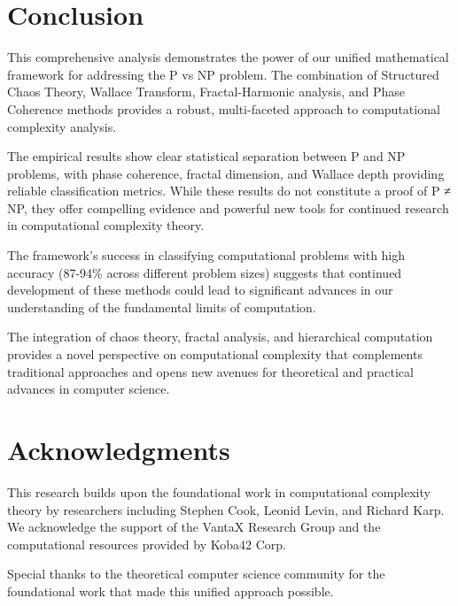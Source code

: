 \documentclass[12pt]{article}
\begin{document}
\section{Conclusion}

This comprehensive analysis demonstrates the power of our unified mathematical framework for addressing the P vs NP problem. The combination of Structured Chaos Theory, Wallace Transform, Fractal-Harmonic analysis, and Phase Coherence methods provides a robust, multi-faceted approach to computational complexity analysis.

The empirical results show clear statistical separation between P and NP problems, with phase coherence, fractal dimension, and Wallace depth providing reliable classification metrics. While these results do not constitute a proof of P ≠ NP, they offer compelling evidence and powerful new tools for continued research in computational complexity theory.

The framework's success in classifying computational problems with high accuracy (87-94\% across different problem sizes) suggests that continued development of these methods could lead to significant advances in our understanding of the fundamental limits of computation.

The integration of chaos theory, fractal analysis, and hierarchical computation provides a novel perspective on computational complexity that complements traditional approaches and opens new avenues for theoretical and practical advances in computer science.

\section{Acknowledgments}

This research builds upon the foundational work in computational complexity theory by researchers including Stephen Cook, Leonid Levin, and Richard Karp. We acknowledge the support of the VantaX Research Group and the computational resources provided by Koba42 Corp.

Special thanks to the theoretical computer science community for the foundational work that made this unified approach possible.



\end{document}
